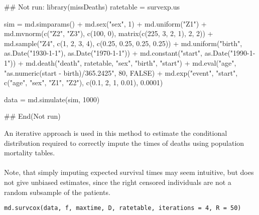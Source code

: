 \documentclass[a4paper]{book}
\begin{document}
%
\begin{Examples}
\begin{ExampleCode}

## Not run: 
library(missDeaths)
ratetable = survexp.us

sim = md.simparams() +
          md.sex("sex", 1) + 
          md.uniform("Z1") +
          md.mvnorm(c("Z2", "Z3"), c(100, 0), matrix(c(225, 3, 2, 1), 2, 2)) +
          md.sample("Z4", c(1, 2, 3, 4), c(0.25, 0.25, 0.25, 0.25)) +
          md.uniform("birth", as.Date("1930-1-1"), as.Date("1970-1-1")) +
          md.constant("start", as.Date("1990-1-1")) +
          md.death("death", ratetable, "sex", "birth", "start") +
          md.eval("age", "as.numeric(start - birth)/365.2425", 80, FALSE) + 
          md.exp("event", "start", c("age", "sex", "Z1", "Z2"), 
             c(0.1, 2, 1, 0.01), 0.0001)
          
data = md.simulate(sim, 1000)

## End(Not run)
\end{ExampleCode}
\end{Examples}
%
\begin{Description}\relax
An iterative approach is used in this method to estimate the conditional
distribution required to correctly impute the times of deaths using
population mortality tables.\\{}\\{}
Note, that simply imputing expected survival times may seem intuitive, 
but does not give unbiased estimates, since the right censored individuals 
are not a random subsample of the patients.
\end{Description}
%
\begin{Usage}
\begin{verbatim}
md.survcox(data, f, maxtime, D, ratetable, iterations = 4, R = 50)
\end{verbatim}
\end{Usage}
%
\end{document}
